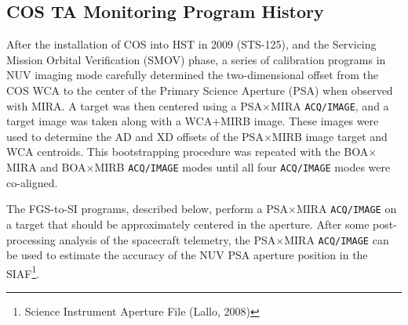 \subsection{COS TA Monitoring Program History}\label{subsec:History}
After the installation of COS into HST in 2009 (STS-125), and the Servicing Mission Orbital Verification (SMOV) phase,
a series of calibration programs in NUV imaging mode carefully determined the two-dimensional offset from the COS WCA to the center of the Primary Science Aperture (PSA) when observed with MIRA.
A target was then centered using a PSA$\times$MIRA \texttt{ACQ/IMAGE}, and a target image was taken along with a WCA+MIRB image. These images were used to determine the AD and XD offsets of the PSA$\times$MIRB image target and WCA centroids.
This bootstrapping procedure was repeated with the BOA$\times$MIRA and BOA$\times$MIRB \texttt{ACQ/IMAGE} modes until all four \texttt{ACQ/IMAGE} modes were co-aligned.

The FGS-to-SI programs, described below, perform a PSA$\times$MIRA \texttt{ACQ/IMAGE} on a target that should be approximately centered in the aperture.
After some post-processing analysis of the spacecraft telemetry, the PSA$\times$MIRA \texttt{ACQ/IMAGE} can be used to estimate the accuracy of the NUV PSA aperture position in the SIAF\footnote{Science Instrument Aperture File (Lallo, 2008)}.


